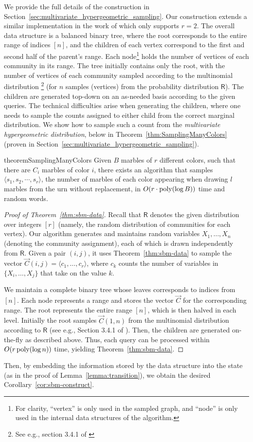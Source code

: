 We provide the full details of the construction in Section~\ref{sec:multivariate_hypergeometric_sampling}.
Our construction extends a similar implementation in the work of \cite{huge} which only supports $r = 2$.
The overall data structure is a balanced binary tree, where the root corresponds to the entire range of indices $[n]$,
and the children of each vertex correspond to the first and second half of the parent's range.
Each node\footnote{For clarity, ``vertex'' is only used in the sampled graph,
and ``node'' is only used in the internal data structures of the algorithm.}
holds the number of vertices of each community in its range.
The tree initially contains only the root, with the number of vertices of each community sampled according to the multinomial distribution
\footnote{See e.g., section 3.4.1 of \cite{knuth}} (for $n$ samples (vertices) from the probability distribution $\mathsf{R}$).
The children are generated top-down on an as-needed basis according to the given queries.
The technical difficulties arise when generating the children,
where one needs to sample the counts assigned to either child from the correct marginal distribution.
We show how to sample such a count from the \emph{multivariate hypergeometric distribution},
below in Theorem~\ref{thm:SamplingManyColors} (proven in Section~\ref{sec:multivariate_hypergeometric_sampling}).

\begin{restatable}{theorem}{SamplingManyColors}
\label{thm:SamplingManyColors}
Given $B$ marbles of $r$ different colors, such that there are $C_i$ marbles of color $i$,
there exists an algorithm that samples $\langle s_1, s_2,\cdots, s_r \rangle$,
the number of marbles of each color appearing when drawing $l$ marbles from the urn without replacement,
in $O(r\cdot\mathrm{poly}(\log B))$ time and random words.
\end{restatable}
\begin{proof}[Proof of Theorem~\ref{thm:sbm-data}]
Recall that $\mathsf{R}$ denotes the given distribution over integers $[r]$ (namely, the random distribution of communities for each vertex).
Our algorithm generates and maintains random variables $X_1, \ldots, X_n$ (denoting the community assignment),
each of which is drawn independently from $\mathsf{R}$.
Given a pair $(i, j)$, it uses Theorem~\ref{thm:sbm-data} to sample the vector $\vec{C}(i, j) = \langle c_1, \ldots, c_r \rangle$,
where $c_k$ counts the number of variables in $\{X_i, \ldots, X_j\}$ that take on the value $k$.

We maintain a complete binary tree whose leaves corresponds to indices from $[n]$.
Each node represents a range and stores the vector $\vec{C}$ for the corresponding range.
The root represents the entire range $[n]$, which is then halved in each level.
Initially the root samples $\vec{C}(1, n)$ from the multinomial distribution according to $\mathsf{R}$
(see e.g., Section 3.4.1 of \cite{knuth}).
Then, the children are generated on-the-fly as described above.
Thus, each query can be processed within $O(r\,\mathrm{poly}(\log n))$ time, yielding Theorem~\ref{thm:sbm-data}.
\end{proof}

Then, by embedding the information stored by the data structure into the state (as in the proof of Lemma~\ref{lemma:transition}),
we obtain the desired Corollary~\ref{cor:sbm-construct}.
